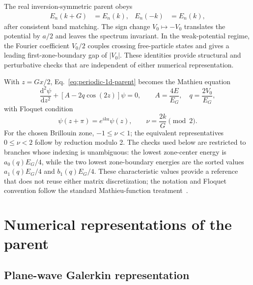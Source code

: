 The real inversion-symmetric parent obeys
\begin{align}
    E_n(k+G)&=E_n(k),
    &
    E_n(-k)&=E_n(k),
    \label{eq:periodic-1d-symmetry}
\end{align}
after consistent band matching. The sign change $V_0\mapsto -V_0$ translates
the potential by $a/2$ and leaves the spectrum invariant. In the weak-potential
regime, the Fourier coefficient $V_0/2$ couples crossing free-particle states
and gives a leading first-zone-boundary gap of $|V_0|$. These identities provide
structural and perturbative checks that are independent of either numerical
representation.

With $z=Gx/2$, Eq.~\eqref{eq:periodic-1d-parent} becomes the Mathieu equation
\begin{equation}
    \frac{\mathrm{d}^2\psi}{\mathrm{d}z^2}
    +\left[A-2q\cos(2z)\right]\psi=0,
    \qquad
    A=\frac{4E}{E_G},
    \quad
    q=\frac{2V_0}{E_G},
    \label{eq:periodic-1d-mathieu}
\end{equation}
with Floquet condition
\begin{equation}
    \psi(z+\pi)=e^{ika}\psi(z),
    \qquad
    \nu=\frac{2k}{G}\pmod 2.
\end{equation}
For the chosen Brillouin zone, $-1\leq\nu<1$; the equivalent representatives
$0\leq\nu<2$ follow by reduction modulo 2. The checks used below are restricted
to branches whose indexing is unambiguous: the lowest zone-center energy is
$a_0(q)E_G/4$, while the two lowest zone-boundary energies are the sorted values
$a_1(q)E_G/4$ and $b_1(q)E_G/4$. These characteristic values provide a
reference that does not reuse either matrix discretization; the notation and
Floquet convention follow the standard Mathieu-function
treatment~\cite{mclachlan1947}.

\section{Numerical representations of the parent}

\subsection{Plane-wave Galerkin representation}

